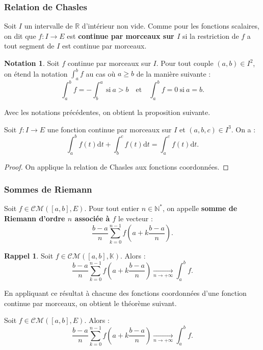 \documentclass[french]{article}
\newcommand{\N}{\mathbb{N}}
\newcommand{\R}{\mathbb{R}}
\newcommand{\K}{\mathbb{K}}
\newcommand{\st}{^*}
\renewcommand{\d}{\text{d}}
\theoremstyle{plain}
\theoremstyle{definition}
\newtheorem*{notation}{Notation}
\newtheorem*{rappel}{Rappel}
\theoremstyle{remark}
\begin{document}
\subsubsection*{Relation de Chasles}

Soit $I$ un intervalle de $\R$ d'intérieur non vide. Comme pour les fonctions scalaires, on dit que $f:I\to E$ est \textbf{continue par morceaux sur $I$} si la restriction de $f$ a tout segment de $I$ est continue par morceaux.

\begin{notation}
	Soit $f$ continue par morceaux sur $I$. Pour tout couple $(a,b)\in I^2$, on étend la notation $\displaystyle\int_{a}^{b}f$ au cas où $a\geqslant b$ de la manière suivante :
	$$\int_{a}^{b}f=-\int_{b}^{a}\ \text{si}\ a>b\quad\text{et}\quad \int_{a}^{b}f=0\ \text{si}\ a=b.$$
\end{notation}

Avec les notations précédentes, on obtient la proposition suivante.

\begin{prop}%
	Soit $f:I\to E$ une fonction continue par morceaux sur $I$ et $(a,b,c)\in I^3$. On a :$$\int_{a}^{b}f(t)\d t+\int_{b}^{c}f(t)\d t=\int_{a}^{c}f(t)\d t.$$
\end{prop}
\begin{proof}
	On applique la relation de Chasles aux fonctions coordonnées.
\end{proof}

\subsubsection*{Sommes de Riemann}

\begin{dfn}
	Soit $f\in\mathcal{CM}([a,b],E)$. Pour tout entier $n\in\N\st$, on appelle \textbf{somme de Riemann d'ordre $n$ associée à $f$} le vecteur :
	$$\frac{b-a}{n}\sum_{k=0}^{n-1}f\left(a+k\frac{b-a}{n}\right).$$
\end{dfn}

\begin{rappel}
	Soit $f\in\mathcal{CM}([a,b],\K)$. Alors :
	$$\frac{b-a}{n}\sum_{k=0}^{n-1}f\left(a+k\frac{b-a}{n}\right)\xrightarrow[n\to+\infty]{}\int_{a}^{b}f.$$
\end{rappel}

En appliquant ce résultat à chacune des fonctions coordonnées d'une fonction continue par morceaux, on obtient le théorème suivant.

\begin{thm}%
	Soit $f\in\mathcal{CM}([a,b],E)$. Alors :
	$$\frac{b-a}{n}\sum_{k=0}^{n-1}f\left(a+k\frac{b-a}{n}\right)\xrightarrow[n\to+\infty]{}\int_{a}^{b}f.$$
\end{thm}
\end{document}
